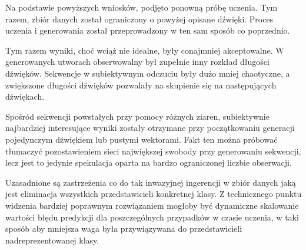 {{        Na podstawie powyższych wniosków, podjęto ponowną próbę uczenia. Tym razem, zbiór danych został
        ograniczony o powyżej opisane dźwięki. Proces uczenia i generowania został przeprowadzony w ten sam sposób
        co poprzednio. 




        Tym razem wyniki, choć wciąż nie idealne, były conajmniej akceptowalne. W generowanych utworach
        obserwowalny był zupełnie inny rozkład długości dźwięków. Sekwencje w subiektywnym odczuciu były dużo mniej
        chaotyczne, a zwiększone długości dźwięków pozwalały na skupienie się na następujących dźwiękach.
        
        Spośród sekwencji powstałych przy pomocy różnych ziaren, subiektywnie najbardziej interesujące wyniki
        zostały otrzymane przy początkowaniu generacji pojedynczym dźwiękiem lub pustymi wektorami.
        Fakt ten można próbować tłumaczyć pozostawieniem sieci największej swobody przy generowaniu sekwencji, lecz
        jest to jedynie spekulacja oparta na bardzo ograniczonej liczbie obserwacji.

        Uzasadnione są zastrzeżenia co do tak inwazyjnej ingerencji w zbiór danych jaką jest eliminacja 
        wszystkich przedstawicieli konkretnej klasy. Z technicznego punktu widzenia bardziej poprawnym 
        rozwiązaniem mogłoby być dynamiczne skalowanie wartości błędu predykcji dla poszczególnych przypadków w czasie uczenia, 
        w taki sposób aby mniejsza waga była przywiązywana do przedstawicieli nadreprezentowanej klasy.
    }
}